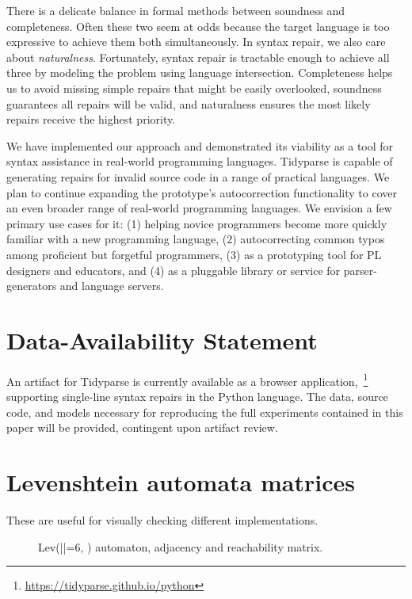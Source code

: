 \documentclass[sigplan,review,acmsmall,nonacm,screen,anonymous]{acmart}\settopmatter{printfolios=false,printccs=false,printacmref=false}
\begin{document}
There is a delicate balance in formal methods between soundness and completeness. Often these two seem at odds because the target language is too expressive to achieve them both simultaneously. In syntax repair, we also care about \textit{naturalness}. Fortunately, syntax repair is tractable enough to achieve all three by modeling the problem using language intersection. Completeness helps us to avoid missing simple repairs that might be easily overlooked, soundness guarantees all repairs will be valid, and naturalness ensures the most likely repairs receive the highest priority.

We have implemented our approach and demonstrated its viability as a tool for syntax assistance in real-world programming languages. Tidyparse is capable of generating repairs for invalid source code in a range of practical languages. We plan to continue expanding the prototype's autocorrection functionality to cover an even broader range of real-world programming languages. We envision a few primary use cases for it: (1) helping novice programmers become more quickly familiar with a new programming language, (2) autocorrecting common typos among proficient but forgetful programmers, (3) as a prototyping tool for PL designers and educators, and (4) as a pluggable library or service for parser-generators and language servers.

\section*{Data-Availability Statement}

An artifact for Tidyparse is currently available as a browser application,~\footnote{\url{https://tidyparse.github.io/python}} supporting single-line syntax repairs in the Python language. The data, source code, and models necessary for reproducing the full experiments contained in this paper will be provided, contingent upon artifact review.

\clearpage\vspace{-1cm}

\pagebreak\appendix

\section{Levenshtein automata matrices}

These are useful for visually checking different implementations.

\begin{figure}[H]
\begin{center}
\end{center}
\caption{Lev(|\sigma|=6, ) automaton, adjacency and reachability matrix.}
\end{figure}
\end{document}
